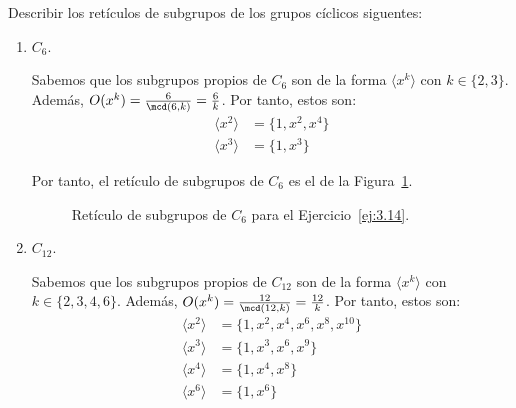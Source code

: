 \begin{ejercicio}\label{ej:3.14}
    Describir los retículos de subgrupos de los grupos cíclicos siguentes:
    \begin{enumerate}
        \item $C_6$.
        
        Sabemos que los subgrupos propios de $C_6$ son de la forma $\langle x^k\rangle$ con $k\in \{2,3\}$. Además, $O(x^k)=\frac{6}{\mcd(6,k)}=\frac{6}{k}$. Por tanto, estos son:
        \begin{align*}
            \langle x^2\rangle &= \{1,x^2,x^4\}\\
            \langle x^3\rangle &= \{1,x^3\}
        \end{align*}

        Por tanto, el retículo de subgrupos de $C_6$ es el de la Figura~\ref{fig:ej14_6}.
        \begin{figure}
            \centering
            \caption{Retículo de subgrupos de $C_6$ para el Ejercicio~\ref{ej:3.14}.}
            \label{fig:ej14_6}
        \end{figure}
        \item $C_{12}$.
        
        Sabemos que los subgrupos propios de $C_{12}$ son de la forma $\langle x^k\rangle$ con $k\in \{2,3,4,6\}$. Además, $O(x^k)=\frac{12}{\mcd(12,k)}=\frac{12}{k}$. Por tanto, estos son:
        \begin{align*}
            \langle x^2\rangle &= \{1,x^2,x^4,x^6,x^8,x^{10}\}\\
            \langle x^3\rangle &= \{1,x^3,x^6,x^9\}\\
            \langle x^4\rangle &= \{1,x^4,x^8\}\\
            \langle x^6\rangle &= \{1,x^6\}
        \end{align*}


\end{enumerate}
\end{ejercicio}

